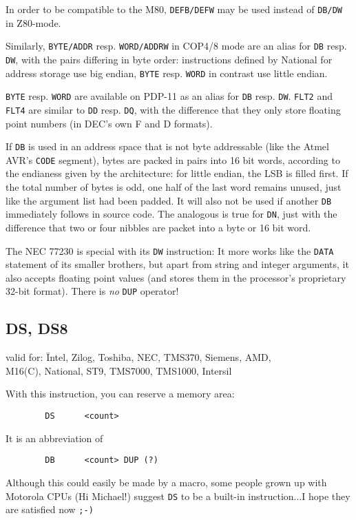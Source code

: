 \documentclass[12pt,twoside]{report}
\makeatletter
\newcommand{\tty}[1]{{\tt #1}}
\newcommand{\ttindex}[1]{\index{#1@{\tt #1}}}
\makeatother
\begin{document}
In order to be compatible to the M80, \tty{DEFB/DEFW} may be used instead of
\tty{DB/DW} in Z80-mode.

Similarly, \tty{BYTE/ADDR} resp. \tty{WORD/ADDRW} in COP4/8 mode are an
alias for \tty{DB} resp. \tty{DW}, with the pairs differing in byte order:
instructions defined by National for address storage use big endian,
\tty{BYTE} resp. \tty{WORD} in contrast use little endian.

\ttindex{FLT2}\ttindex{FLT4}
\tty{BYTE} resp. \tty{WORD} are available on PDP-11 as an alias for
\tty{DB} resp. \tty{DW}.  \tty{FLT2} and \tty{FLT4} are similar to
 \tty{DD} resp. \tty{DQ}, with the difference that they only store
floating point numbers (in DEC's own F and D formats).

If \tty{DB} is used in an address space that is not byte addressable (like
the Atmel AVR's \tty{CODE} segment), bytes are packed in pairs into 16 bit
words, according to the endianess given by the architecture: for little
endian, the LSB is filled first.  If the total number of bytes is odd, one
half of the last word remains unused, just like the argument list had been
padded.  It will also not be used if another \tty{DB} immediately follows
in source code.  The analogous is true for \tty{DN}, just with the difference
that two or four nibbles are packet into a byte or 16 bit word.

The NEC 77230 is special with its \tty{DW} instruction: It more works like
the \tty{DATA} statement of its smaller brothers, but apart from string
and integer arguments, it also accepts floating point values (and stores
them in the processor's proprietary 32-bit format). There is {\em no}
\tty{DUP} operator!


\subsection{DS, DS8}
\ttindex{DS}
\ttindex{DS8}

{\em\begin{tabbing}
valid for: \= Intel, Zilog, Toshiba, NEC, TMS370, Siemens, AMD, \\
           \> M16(C), National, ST9, TMS7000, TMS1000, Intersil
\end{tabbing}}

With this instruction, you can reserve a memory area:
\begin{verbatim}
        DS      <count>
\end{verbatim}
It is an abbreviation of
\begin{verbatim}
        DB      <count> DUP (?)
\end{verbatim}
Although this could easily be made by a macro, some people grown up
with Motorola CPUs (Hi Michael!) suggest \tty{DS} to be a built-in
instruction...I hope they are satisfied now \tty{;-)}
\end{document}

